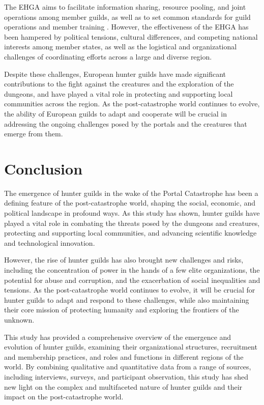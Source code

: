 \documentclass[12pt]{article}
\begin{document}
The EHGA aims to facilitate information sharing, resource pooling, and joint operations among member guilds, as well as to set common standards for guild operations and member training \cite{Krasniqi2027}. However, the effectiveness of the EHGA has been hampered by political tensions, cultural differences, and competing national interests among member states, as well as the logistical and organizational challenges of coordinating efforts across a large and diverse region.

Despite these challenges, European hunter guilds have made significant contributions to the fight against the creatures and the exploration of the dungeons, and have played a vital role in protecting and supporting local communities across the region. As the post-catastrophe world continues to evolve, the ability of European guilds to adapt and cooperate will be crucial in addressing the ongoing challenges posed by the portals and the creatures that emerge from them.

\section{Conclusion}
The emergence of hunter guilds in the wake of the Portal Catastrophe has been a defining feature of the post-catastrophe world, shaping the social, economic, and political landscape in profound ways. As this study has shown, hunter guilds have played a vital role in combating the threats posed by the dungeons and creatures, protecting and supporting local communities, and advancing scientific knowledge and technological innovation.

However, the rise of hunter guilds has also brought new challenges and risks, including the concentration of power in the hands of a few elite organizations, the potential for abuse and corruption, and the exacerbation of social inequalities and tensions. As the post-catastrophe world continues to evolve, it will be crucial for hunter guilds to adapt and respond to these challenges, while also maintaining their core mission of protecting humanity and exploring the frontiers of the unknown.

This study has provided a comprehensive overview of the emergence and evolution of hunter guilds, examining their organizational structures, recruitment and membership practices, and roles and functions in different regions of the world. By combining qualitative and quantitative data from a range of sources, including interviews, surveys, and participant observation, this study has shed new light on the complex and multifaceted nature of hunter guilds and their impact on the post-catastrophe world.
\end{document}

